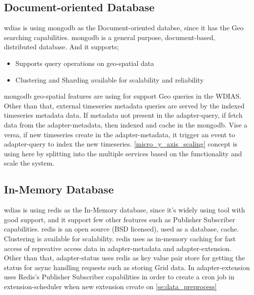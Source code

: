 \subsection{Document-oriented Database}
\label{subse:mongodb}

\acrshort{wdias} is using \acrshort{mongodb} as the Document-oriented databse, since it has the Geo searching capabilities.
\acrshort{mongodb} \cite{mongodbMongoDBManual} is a general purpose, document-based, distributed database. And it supports;
\begin{itemize}
  \item Supports query operations on geo-spatial data \cite{mongodbMongoDBManual}
  \item Clustering and Sharding available for scalability and reliability
\end{itemize}
\acrshort{mongodb} geo-spatial features are using for support Geo queries in the WDIAS. Other than that, external timeseries metadata queries are served by the indexed timeseries metadata data.
If metadata not present in the adapter-query, if fetch data from the adapter-metadata, then indexed and cache in the \acrshort{mongodb}. Vise a versa, if new timeseries create in the adapter-metadata, it trigger an event to adapter-query to index the new timeseries.
\ref{micro_y_axis_scaling} concept is using here by splitting into the multiple services based on the functionality and scale the system.

\subsection{In-Memory Database}
\label{subse:redis}
\acrshort{wdias} is using \acrshort{redis} \cite{redisRedisDocumentation} as the In-Memory database, since it's widely using tool with good support, and it support few other features such as Publisher Subscriber capabilities.
\acrshort{redis} is an open source (BSD licensed), used as a database, cache. Clustering is available for scalability.
\acrshort{redis} uses as in-memory caching for fast access of repreative access data in adapter-metadata and adapter-extension.
Other than that, adapter-status uses \acrshort{redis} as key value pair store for getting the status for async handling requests such as storing Grid data.
In adapter-extension uses Redis's Publisher Subscriber capabilities in order to create a cron job in extension-scheduler when new extension create on \ref{se:data_preprocess}
